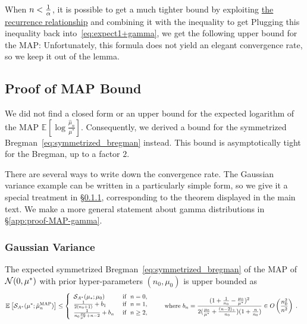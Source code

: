 \documentclass[twoside]{article}
\newcommand*{\expect}[2][]{\ensuremath{\mathbb{E}_{#1} \left[ #2 \right] }} %
\newcommand{\logpart}{A}
\newcommand{\conj}{{\logpart^*}}
\newcommand{\m}{\mu}
\newcommand{\MAPm}{\hat \m_n}
\begin{document}
When $n<\frac{1}{\alpha}$, it is possible to get a much tighter bound by exploiting \href{http://dlmf.nist.gov/8.19.E12}{the recurrence relationship} \cite[Eq.~8.19.12]{DLMF}
and combining it with the inequality \citep[Eq.~8.19.21]{DLMF} to get
Plugging this inequality back into~\eqref{eq:expect1+gamma}, we get the following upper bound for the MAP:
\alignn{
	\expect{\frac{\mu^*}{\MAPm}} 
	\leq \frac{n_0 + n}{a} \frac{a\alpha + 1}{n \alpha + a \alpha +1}
	= \frac{n_0 + n}{a + n +\inv{\alpha}} \paren{1 + \inv{a \alpha}} \; .
}
Unfortunately, this formula does not yield an elegant convergence rate, so we keep it out of the lemma. 


\subsection{Proof of MAP Bound}
\label{app:MAP-bound}

We did not find a closed form or an upper bound for the expected logarithm of the MAP $\expect{\log\frac{\MAPm}{\mu^*}}$.
Consequently, we derived a bound for the symmetrized Bregman~\eqref{eq:symmetrized_bregman} instead. 
This bound is asymptotically tight for the Bregman, up to a factor $2$.

There are several ways to write down the convergence rate. The Gaussian variance example can be written in a particularly simple form, so we give  it a special treatment in \S\ref{app:proof-MAP-gaussian}, corresponding to the theorem displayed in the main text.
We make a more general statement about gamma distributions in \S\ref{app:proof-MAP-gamma}.


\subsubsection{Gaussian Variance}
\label{app:proof-MAP-gaussian}

\begin{theorem}
The expected symmetrized Bregman~\eqref{eq:symmetrized_bregman} of the MAP of $\cN(  0,\m^*)$ with prior hyper-parameters $(n_0,\m_0)$ is upper bounded as
 \begin{align}
	& \expect{\cS_\conj( \m^*; \hat \m_n^\mathrm{MAP})}
	\leq 
	\left\{\begin{array}{ll}
		\cS_\conj( \mu_*; \mu_0) 					& \text{ if } \ n=0, \\
		\inv{2(n_0+1)}  +  b_1 						& \text{ if }\ n=1,\\
		\frac{1}{n_0 \frac{\m_0}{\m^*} +n-2} + b_n  & \text{ if }\ n\geq 2,
	\end{array}\right.
	\quad 
	\quad 
	\text{where }
	b_n = \frac{(1 + \inv{n_0} - \frac{\m_0}{\m^*})^2}{2 (\frac{\m_0}{\m^*}+\frac{(n-2)_+}{n_0})(1 + \frac{n}{n_0} )} \in O\paren{\frac{n_0^2}{n^2}} \; . 
\end{align}
\end{theorem} 
\end{document}
